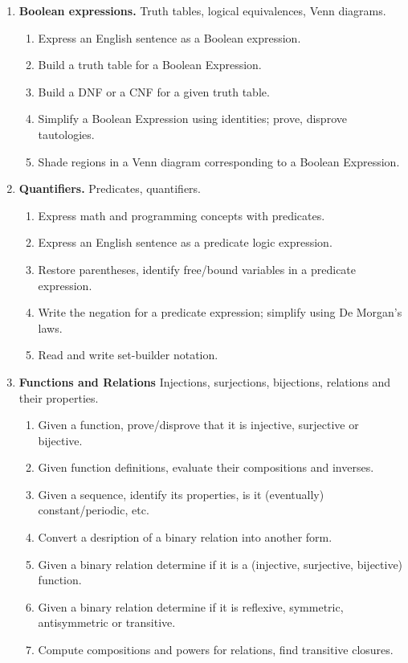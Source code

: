 \documentclass[a4paper,12pt]{article}
\begin{document}
{\small
\begin{enumerate}

\item \textbf{Boolean expressions.} Truth tables, logical equivalences, Venn diagrams.
\begin{enumerate}
\item Express an English sentence as a Boolean expression. 
\item Build a truth table for a Boolean Expression.
\item Build a DNF or a CNF for a given truth table.
\item Simplify a Boolean Expression using identities; prove, disprove tautologies. 
\item Shade regions in a Venn diagram corresponding to a Boolean Expression.
\end{enumerate}
\item \textbf{Quantifiers.} Predicates, quantifiers.
\begin{enumerate} 
\item Express math and programming concepts with predicates.
\item Express an English sentence as a predicate logic expression.
\item Restore parentheses, identify free/bound variables in a predicate expression.
\item Write the negation for a predicate expression; simplify using De Morgan's laws.
\item Read and write set-builder notation.
\end{enumerate}
\item \textbf{Functions and Relations} Injections, surjections, bijections, relations and their properties.
\begin{enumerate}
\item Given a function, prove/disprove that it is injective, surjective or bijective.
\item Given function definitions, evaluate their compositions and inverses.
\item Given a sequence, identify its properties, is it (eventually) constant/periodic, etc.
\item Convert a desription of a binary relation into another form.
\item Given a binary relation determine if it is a (injective, surjective, bijective) function.
\item Given a binary relation determine if it is reflexive, symmetric, antisymmetric or transitive.
\item Compute compositions and powers for relations, find transitive closures.

\end{enumerate}
\end{enumerate}}
\end{document}
